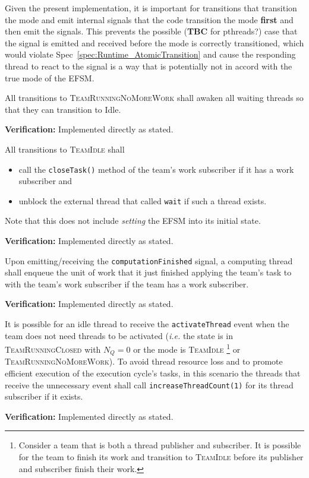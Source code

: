 \documentclass{article}
\newcommand{\TeamIdle}          {\textsc{TeamIdle}}
\newcommand{\TeamRunningClosed} {\textsc{TeamRunningClosed}}
\newcommand{\TeamRunningNoMoreWork} {\textsc{TeamRunningNoMoreWork}}
\begin{document}
Given the present implementation, it is important for transitions that
transition the mode and emit internal signals that the code transition the mode
\textbf{first} and then emit the signals.  This prevents the possible
(\textbf{TBC} for pthreads?) case that the signal is emitted and received before
the mode is correctly transitioned, which would violate
Spec~\ref{spec:Runtime_AtomicTransition} and cause the responding thread
to react to the signal is a way that is potentially not in accord with the true
mode of the EFSM.

\begin{spec}
\label{spec:Runtime_AwakenOnNoMoreWork}
All transitions to {\TeamRunningNoMoreWork} shall awaken all waiting threads so
that they can transition to Idle.
\end{spec}
\textbf{Verification:}\hspace{0.125in}  Implemented directly as stated.

\begin{spec}
\label{spec:Runtime_IdleOutput}
All transitions to {\TeamIdle} shall
\begin{itemize}
\item{call the \texttt{closeTask()} method of the team's work subscriber if it
has a work subscriber and }
\item{unblock the external thread that called \texttt{wait} if such a thread
exists.}
\end{itemize}
Note that this does not include \textit{setting} the EFSM into its initial
state.
\end{spec}
\textbf{Verification:}\hspace{0.125in}  Implemented directly as stated.

\begin{spec}
Upon emitting/receiving the \texttt{computationFinished} signal, a computing
thread shall enqueue the unit of work that it just finished applying the team's
task to with the team's work subscriber if the team has a work subscriber.
\end{spec}
\textbf{Verification:}\hspace{0.125in}  Implemented directly as stated.

\begin{spec}
It is possible for an idle thread to receive the \texttt{activateThread} event
when the team does not need threads to be activated (\textit{i.e.} the state is
in {\TeamRunningClosed} with $N_Q = 0$ or the mode is \TeamIdle
\footnote{Consider a team that is both a thread publisher and subscriber.  It is
possible for the team to finish its work and transition to {\TeamIdle} before
its publisher and subscriber finish their work.} or \TeamRunningNoMoreWork).  To
avoid thread resource loss and to promote efficient execution of the execution
cycle's tasks, in this scenario the threads that receive the unnecessary event
shall call \texttt{increaseThreadCount(1)} for its thread subscriber if it
exists.
\end{spec}
\textbf{Verification:}\hspace{0.125in} Implemented directly as stated.
\end{document}
